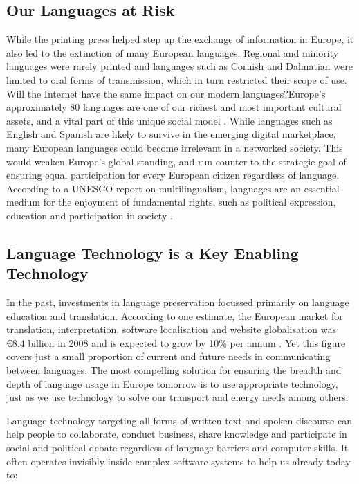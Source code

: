 \documentclass{../../metanetpaper}
\begin{document}
\begin{multicols}{2}
\subsection{Our Languages at Risk}

While the printing press helped step up the exchange of information in Europe, it also led to the extinction of many European languages. Regional and minority languages were rarely printed and languages such as Cornish and Dalmatian were limited to oral forms of transmission, which in turn restricted their scope of use. Will the Internet have the same impact on our modern languages?Europe’s approximately 80 languages are one of our richest and most important cultural assets, and a vital part of this unique social model \cite{EC2}. While languages such as English and Spanish are likely to survive in the emerging digital marketplace, many European languages could become irrelevant in a networked society. This would weaken Europe’s global standing, and run counter to the strategic goal of ensuring equal participation for every European citizen regardless of language. According to a UNESCO report on multilingualism, languages are an essential medium for the enjoyment of fundamental rights, such as political expression, education and participation in society \cite{Unesco1}.

\subsection{Language Technology is a Key Enabling Technology}

In the past, investments in language preservation focussed primarily on language education and translation. According to one estimate, the European market for translation, interpretation, software localisation and website globalisation was €8.4 billion in 2008 and is expected to grow by 10\% per annum \cite{EC3}. Yet this figure covers just a small proportion of current and future needs in communicating between languages. The most compelling solution for ensuring the breadth and depth of language usage in Europe tomorrow is to use appropriate technology, just as we use technology to solve our transport and energy needs among others.

Language technology targeting all forms of written text and spoken discourse can help people to collaborate, conduct business, share knowledge and participate in social and political debate regardless of language barriers and computer skills. It often operates invisibly inside complex software systems to help us already today to:


\end{multicols}
\end{document}
